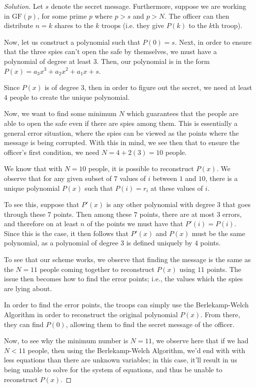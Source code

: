 \documentclass{article}
\newenvironment{solution}{\begin{proof}[Solution]}{\end{proof}}
\begin{document}
\begin{solution}
	Let $s$ denote the secret message. Furthermore, suppose we are working in $\mathrm{GF}(p)$, for some prime $p$ where $p > s$ and $p > N$. The officer can then distribute $n=k$ shares to the $k$ troops (i.e. they give $P(k)$ to the $k$th troop).
	
	Now, let us construct a polynomial such that $P(0) = s$. Next, in order to ensure that the three spies can't open the safe by themselves, we must have a polynomial of degree at least $3$. Then, our polynomial is in the form $P(x) = a_{3}x^{3} + a_{2}x^{2} + a_{1}x + s$.
	
	Since $P(x)$ is of degree $3$, then in order to figure out the secret, we need at least $4$ people to create the unique polynomial.
	
	Now, we want to find some minimum $N$ which guarantees that the people are able to open the safe even if there are spies among them. This is essentially a general error situation, where the spies can be viewed as the points where the message is being corrupted. With this in mind, we see then that to ensure the officer's first condition, we need $N = 4 + 2(3) = 10$ people.
	
	We know that with $N = 10$ people, it is possible to reconstruct $P(x)$. We observe that for any given subset of $7$ values of $i$ between $1$ and $10$, there is a unique polynomial $P(x)$ such that $P(i) = r_{i}$ at these values of $i$.
	
	To see this, suppose that $P'(x)$ is any other polynomial with degree $3$ that goes through these $7$ points. Then among these $7$ points, there are at most $3$ errors,
	and therefore on at least $n$ of the points we must have that $P'(i) = P(i)$. Since this is the case, it then follows that $P'(x)$ and $P(x)$ must be the same polynomial, as a polynomial of degree $3$ is defined uniquely by $4$ points.
	
	To see that our scheme works, we observe that finding the message is the same as the $N=11$ people coming together to reconstruct $P(x)$ using $11$ points. The issue then becomes how to find the error points; i.e., the values which the spies are lying about.
	
	In order to find the error points, the troops can simply use the Berlekamp-Welch Algorithm in order to reconstruct the original polynomial $P(x)$. From there, they can find $P(0)$, allowing them to find the secret message of the officer.
	
	Now, to see why the minimum number is $N=11$, we observe here that if we had $N < 11$ people, then using the Berlekamp-Welch Algorithm, we'd end with with less equations than there are unknown variables; in this case, it'll result in us being unable to solve for the system of equations, and thus be unable to reconstruct $P(x)$.
\end{solution}
\end{document}
